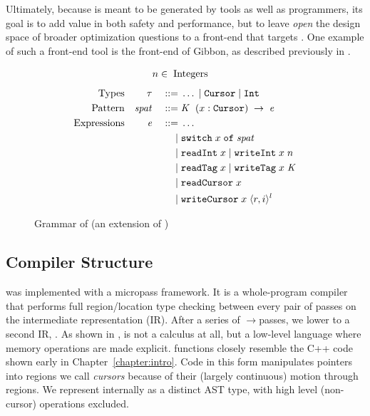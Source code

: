 Ultimately, because \ourcalc is meant to be generated by tools as well as programmers,
its goal is to add value in both safety and performance, but to leave
\emph{open} the design space of broader optimization questions to a front-end that
targets \ourcalc{}. One example of such a front-end tool is the front-end of
Gibbon, as described previously in .

\begin{figure}
  \begin{displaymath}
    \begin{aligned}
      &n \in \; \textup{Integers}
    \end{aligned}
  \end{displaymath}
  \begin{displaymath}
    \begin{aligned}
      \textup{Types} && \mathit{\tau} && \; ::= \; & \ldots \; | \; \texttt{Cursor} \; | \; \texttt{Int} \\
      \textup{Pattern} && \mathit{spat} && \; ::= \; & \mathit{K} \; \;(x : \texttt{Cursor}) \;\rightarrow \;\mathit{e} \\
      \textup{Expressions} && \mathit{e} && \; ::= \; & \dots \\
      && && \; | \; & \texttt{switch}\; x \;\texttt{of}\;\mathit{spat}\\
      && && \; | \; & \texttt{\text{readInt}} \; x \; | \; \texttt{\text{writeInt}} \; x \; n \\
      && && \; | \; & \texttt{\text{readTag}} \; x \; | \; \texttt{\text{writeTag}} \; x \; \mathit{K} \\
      && && \; | \; & \texttt{\text{readCursor}} \; x \\
      && && \; | \; & \texttt{\text{writeCursor}} \; x \; \langle r, i \rangle ^{l} \\
    \end{aligned}
  \end{displaymath}
  \normalsize
  \caption{{Grammar of \lamcur{} (an extension of \ourcalc{}) \captionscrunch}}
  \label{fig:nocal-grammar}
\end{figure}

\subsection{Compiler Structure}\label{subsec:compiler_structure}
\ourcalc was implemented with a micropass framework. It is a whole-program
compiler that performs full region/location type checking
between every pair of passes on the \ourcalc intermediate representation (IR).
%
%
After a series of \ourcalc$\rightarrow$\ourcalc passes, we lower to a second IR,
\emph{\lamcur}.
As shown in ,
\lamcur is not a calculus at all, but a low-level language where
memory operations are made explicit.  \lamcur{} functions closely resemble the C++
code shown early in Chapter~\ref{chapter:intro}.
%
Code in this form manipulates pointers into regions we call {\em cursors} because of
their (largely continuous) motion through regions.
%
{We represent \lamcur internally as a
  distinct AST type, with high level (non-cursor) operations excluded.}

